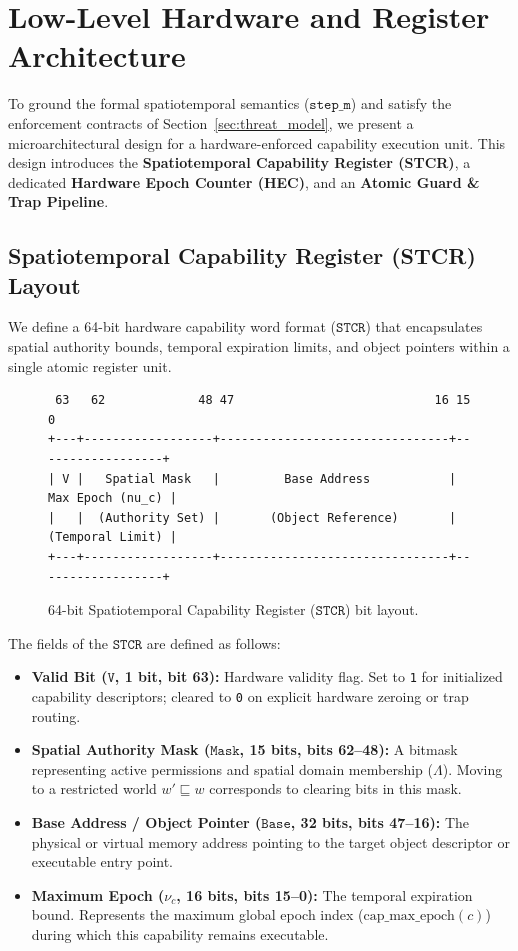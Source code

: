\section{Low-Level Hardware and Register Architecture}
\label{sec:hardware_architecture}

To ground the formal spatiotemporal semantics ($\mathtt{step\_m}$) and satisfy the enforcement contracts of Section~\ref{sec:threat_model}, we present a microarchitectural design for a hardware-enforced capability execution unit. This design introduces the \textbf{Spatiotemporal Capability Register (STCR)}, a dedicated \textbf{Hardware Epoch Counter (HEC)}, and an \textbf{Atomic Guard \& Trap Pipeline}.

\subsection{Spatiotemporal Capability Register (STCR) Layout}

We define a 64-bit hardware capability word format ($\mathtt{STCR}$) that encapsulates spatial authority bounds, temporal expiration limits, and object pointers within a single atomic register unit.

\begin{figure}[h]
\centering
\begin{verbatim}
 63   62             48 47                            16 15               0
+---+------------------+--------------------------------+------------------+
| V |   Spatial Mask   |         Base Address           | Max Epoch (nu_c) |
|   |  (Authority Set) |       (Object Reference)       | (Temporal Limit) |
+---+------------------+--------------------------------+------------------+
\end{verbatim}
\caption{64-bit Spatiotemporal Capability Register ($\mathtt{STCR}$) bit layout.}
\label{fig:stcr_layout}
\end{figure}

The fields of the $\mathtt{STCR}$ are defined as follows:
\begin{itemize}
    \item \textbf{Valid Bit ($\mathtt{V}$, 1 bit, bit 63):} Hardware validity flag. Set to \texttt{1} for initialized capability descriptors; cleared to \texttt{0} on explicit hardware zeroing or trap routing.
    \item \textbf{Spatial Authority Mask ($\mathtt{Mask}$, 15 bits, bits 62--48):} A bitmask representing active permissions and spatial domain membership ($\Lambda$). Moving to a restricted world $w' \sqsubseteq w$ corresponds to clearing bits in this mask.
    \item \textbf{Base Address / Object Pointer ($\mathtt{Base}$, 32 bits, bits 47--16):} The physical or virtual memory address pointing to the target object descriptor or executable entry point.
    \item \textbf{Maximum Epoch ($\nu_c$, 16 bits, bits 15--0):} The temporal expiration bound. Represents the maximum global epoch index ($\text{cap\_max\_epoch}(c)$) during which this capability remains executable.
\end{itemize}

